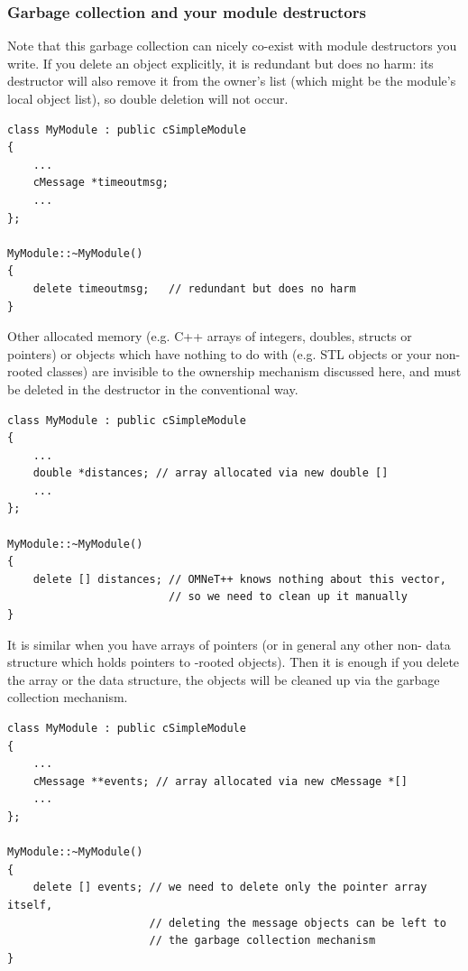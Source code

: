 \subsubsection{Garbage collection and your module destructors}

Note that this garbage collection can nicely co-exist with module destructors
you write. If you delete an object explicitly, it is redundant
but does no harm: its destructor will also remove it from the
owner's list (which might be the module's local object list),
so double deletion will not occur.

\begin{verbatim}
class MyModule : public cSimpleModule
{
    ...
    cMessage *timeoutmsg;
    ...
};

MyModule::~MyModule()
{
    delete timeoutmsg;   // redundant but does no harm
}
\end{verbatim}

Other allocated memory (e.g. C++ arrays of integers, doubles, structs
or pointers) or objects which have nothing to do with 
(e.g. STL objects or your non- rooted classes)
are invisible to the ownership mechanism discussed here,
and must be deleted in the destructor in the conventional way.

\begin{verbatim}
class MyModule : public cSimpleModule
{
    ...
    double *distances; // array allocated via new double []
    ...
};

MyModule::~MyModule()
{
    delete [] distances; // OMNeT++ knows nothing about this vector,
                         // so we need to clean up it manually
}
\end{verbatim}

It is similar when you have arrays of  pointers
(or in general any other non-{\opp} data structure which holds pointers to
-rooted objects). Then it is enough if you delete
the array or the data structure, the objects will be cleaned up
via the garbage collection mechanism.

\begin{verbatim}
class MyModule : public cSimpleModule
{
    ...
    cMessage **events; // array allocated via new cMessage *[]
    ...
};

MyModule::~MyModule()
{
    delete [] events; // we need to delete only the pointer array itself,
                      // deleting the message objects can be left to
                      // the garbage collection mechanism
}
\end{verbatim}

